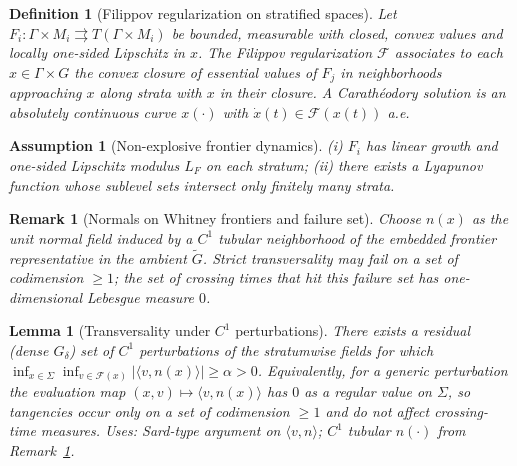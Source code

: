 \documentclass[10pt]{article}
\newtheorem{assumption}{Assumption}
\newtheorem{lemma}{Lemma}
\newtheorem{definition}{Definition}
\newtheorem{remark}{Remark}
\begin{document}
\begin{definition}[Filippov regularization on stratified spaces]\label{def:filippov}
Let $F_i: \Gamma\times M_i\rightrightarrows T(\Gamma\times M_i)$ be bounded, measurable with closed, convex values and locally one-sided Lipschitz in $x$. The Filippov regularization $\mathcal F$ associates to each $x\in\Gamma\times G$ the convex closure of essential values of $F_j$ in neighborhoods approaching $x$ along strata with $x$ in their closure. A Carath\'eodory solution is an absolutely continuous curve $x(\cdot)$ with $\dot x(t)\in \mathcal F(x(t))$ a.e.
\end{definition}

\begin{assumption}[Non-explosive frontier dynamics]\label{ass:nonexpl}
(i) $F_i$ has linear growth and one-sided Lipschitz modulus $L_F$ on each stratum; (ii) there exists a Lyapunov function whose sublevel sets intersect only finitely many strata.
\end{assumption}

\begin{remark}[Normals on Whitney frontiers and failure set]\label{rem:tube-normal}
Choose $n(x)$ as the unit normal field induced by a $C^1$ tubular neighborhood of the embedded frontier representative in the ambient $\widetilde G$. 
Strict transversality may fail on a set of codimension $\ge 1$; the set of \emph{crossing times} that hit this failure set has one-dimensional Lebesgue measure $0$.
\end{remark}

\begin{lemma}[Transversality under $C^1$ perturbations]\label{lem:generic-trans}
There exists a residual (dense $G_\delta$) set of $C^1$ perturbations of the stratumwise fields for which 
$\inf_{x\in\Sigma}\inf_{v\in\mathcal F(x)}|\langle v,n(x)\rangle|\ge \alpha>0$.
Equivalently, for a generic perturbation the evaluation map $(x,v)\mapsto\langle v,n(x)\rangle$ has $0$ as a regular value on $\Sigma$, so tangencies occur only on a set of codimension $\ge1$ and do not affect crossing-time measures. 
\emph{Uses:} Sard-type argument on $\langle v,n\rangle$; $C^1$ tubular $n(\cdot)$ from Remark~\ref{rem:tube-normal}.
\end{lemma}
\end{document}

